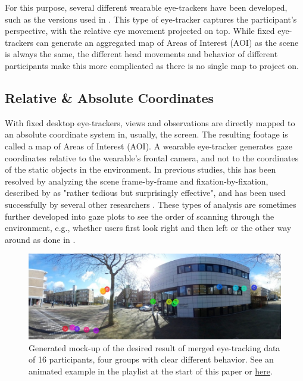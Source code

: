\documentclass[sigconf, natbib=false, nonacm]{acmart}
\begin{document}
    For this purpose, several different wearable eye-trackers have been developed, such as the versions used in \cite{Mantuano2017a, Zeuwts2016, Rupi2019, Gruden2021, Trefzger2018}. This type of eye-tracker captures the participant's perspective, with the relative eye movement projected on top. While fixed eye-trackers can generate an aggregated map of Areas of Interest (AOI) as the scene is always the same, the different head movements and behavior of different participants make this more complicated as there is no single map to project on.
    
    \subsection{Relative \& Absolute Coordinates}
    With fixed desktop eye-trackers, views and observations are directly mapped to an absolute coordinate system in, usually, the screen. The resulting footage is called a map of Areas of Interest (AOI). A wearable eye-tracker generates gaze coordinates relative to the wearable's frontal camera, and not to the coordinates of the static objects in the environment. In previous studies, this has been resolved by analyzing the scene frame-by-frame and fixation-by-fixation, described by \citeauthor{Duchowski2007} as "rather tedious but surprisingly effective", and has been used successfully by several other researchers \cite{Duchowski2007, Mantuano2017a, Vansteenkiste2015}. These types of analysis are sometimes further developed into gaze plots to see the order of scanning through the environment, e.g., whether users first look right and then left or the other way around as done in \cite{Gruden2021}. 
    
    \begin{figure}
        \includegraphics[width=\linewidth]{figures/2-met-video_sample.jpg}
        \caption{Generated mock-up of the desired result of merged eye-tracking data of 16 participants, four groups with clear different behavior. See an animated example in the playlist at the start of this paper or \href{https://youtube.com/playlist?list=PLzh4mA3kUCz2J9pJhzKEI88LiCYvB9BQk}{here}.}
        \label{fig:mapped-example}
    \end{figure}
    
\end{document}
